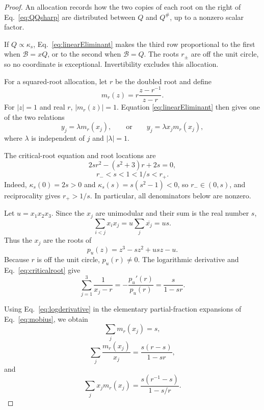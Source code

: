\begin{proof}
An allocation records how the two copies of each root on the right of Eq.~\eqref{eq:QQsharp} are distributed between $Q$ and $Q^\#$, up to a nonzero scalar factor.

If $Q\propto\kappa_s$, Eq.~\eqref{eq:linearEliminant} makes the third row proportional to the first when $\mathcal B=xQ$, or to the second when $\mathcal B=Q$.  The roots $r_\pm$ are off the unit circle, so no coordinate is exceptional.  Invertibility excludes this allocation.

For a squared-root allocation, let $r$ be the doubled root and define
\begin{equation}
m_r(z)=r\frac{z-r^{-1}}{z-r}.
\label{eq:mobius}
\end{equation}
For $|z|=1$ and real $r$, $|m_r(z)|=1$.  Equation \eqref{eq:linearEliminant} then gives one of the two relations
\begin{equation}
y_j=\lambda m_r(x_j),
\qquad\text{or}\qquad
y_j=\lambda x_jm_r(x_j),
\label{eq:twoMobiusAllocations}
\end{equation}
where $\lambda$ is independent of $j$ and $|\lambda|=1$.

The critical-root equation and root locations are
\begin{equation}
2sr^2-(s^2+3)r+2s=0,
\label{eq:criticalroot}
\end{equation}
\begin{equation}
r_-<s<1<1/s<r_+.
\label{eq:rootlocations}
\end{equation}
Indeed, $\kappa_s(0)=2s>0$ and $\kappa_s(s)=s(s^2-1)<0$, so $r_-\in(0,s)$, and reciprocality gives $r_+>1/s$. In particular, all denominators below are nonzero.

Let $u=x_1x_2x_3$.  Since the $x_j$ are unimodular and their sum is the real number $s$,
\begin{equation}
\sum_{i<j}x_ix_j=u\sum_j\overline{x_j}=us.
\label{eq:secondsymmetric}
\end{equation}
Thus the $x_j$ are the roots of
\begin{equation}
p_u(z)=z^3-sz^2+usz-u.
\label{eq:pu}
\end{equation}
Because $r$ is off the unit circle, $p_u(r)\neq0$.  The logarithmic derivative and Eq.~\eqref{eq:criticalroot} give
\begin{equation}
\sum_{j=1}^3\frac{1}{x_j-r}
=-\frac{p_u'(r)}{p_u(r)}
=\frac{s}{1-sr}.
\label{eq:logderivative}
\end{equation}

Using Eq.~\eqref{eq:logderivative} in the elementary partial-fraction expansions of Eq.~\eqref{eq:mobius}, we obtain
\begin{equation}
\sum_jm_r(x_j)=s,
\label{eq:mobiusSum0}
\end{equation}
\begin{equation}
\sum_j\frac{m_r(x_j)}{x_j}
=\frac{s(r-s)}{1-sr},
\label{eq:mobiusSumMinus}
\end{equation}
and
\begin{equation}
\sum_jx_jm_r(x_j)
=\frac{s(r^{-1}-s)}{1-s/r}.
\label{eq:mobiusSumPlus}
\end{equation}


\end{proof}

